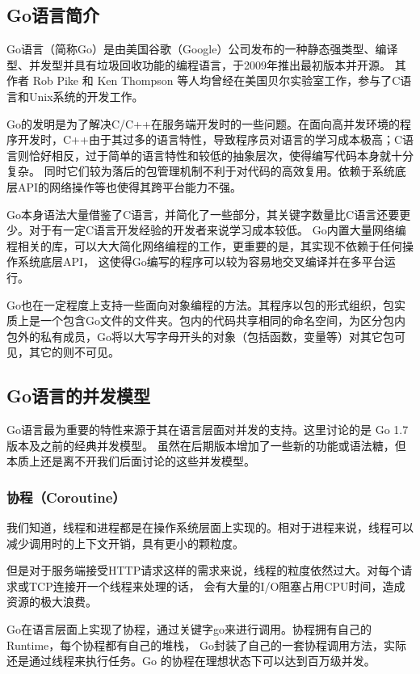\documentclass[twoside]{CUGThesis}
\begin{document}
	\subsection{Go语言简介}
	Go语言（简称Go）是由美国谷歌（Google）公司发布的一种静态强类型、编译型、并发型并具有垃圾回收功能的编程语言\cite{donovan2015go}，于2009年推出最初版本并开源。
	其作者 Rob Pike 和 Ken Thompson 等人均曾经在美国贝尔实验室工作，参与了C语言和Unix系统的开发工作。\par 
	Go的发明是为了解决C/C++在服务端开发时的一些问题。在面向高并发环境的程序开发时，C++由于其过多的语言特性，导致程序员对语言的学习成本极高；C语言则恰好相反，过于简单的语言特性和较低的抽象层次，使得编写代码本身就十分复杂。
	同时它们较为落后的包管理机制不利于对代码的高效复用。依赖于系统底层API的网络操作等也使得其跨平台能力不强。\par
	Go本身语法大量借鉴了C语言，并简化了一些部分，其关键字数量比C语言还要更少。对于有一定C语言开发经验的开发者来说学习成本较低。
	Go内置大量网络编程相关的库，可以大大简化网络编程的工作，更重要的是，其实现不依赖于任何操作系统底层API，
	这使得Go编写的程序可以较为容易地交叉编译并在多平台运行。\par
	Go也在一定程度上支持一些面向对象编程的方法。其程序以包的形式组织，包实质上是一个包含Go文件的文件夹。包内的代码共享相同的命名空间，为区分包内
	包外的私有成员，Go将以大写字母开头的对象（包括函数，变量等）对其它包可见，其它的则不可见。\par 
	\subsection{Go语言的并发模型}
	Go语言最为重要的特性来源于其在语言层面对并发的支持。这里讨论的是 Go 1.7 版本及之前的经典并发模型。
	虽然在后期版本增加了一些新的功能或语法糖，但本质上还是离不开我们后面讨论的这些并发模型。
	\subsubsection{协程（Coroutine）}
	我们知道，线程和进程都是在操作系统层面上实现的。相对于进程来说，线程可以减少调用时的上下文开销，具有更小的颗粒度。\par 
	但是对于服务端接受HTTP请求这样的需求来说，线程的粒度依然过大。对每个请求或TCP连接开一个线程来处理的话，
	会有大量的I/O阻塞占用CPU时间，造成资源的极大浪费。\par 
	Go在语言层面上实现了协程，通过关键字go来进行调用。协程拥有自己的Runtime，每个协程都有自己的堆栈，
	Go封装了自己的一套协程调用方法，实际还是通过线程来执行任务。Go 的协程在理想状态下可以达到百万级并发\cite{deshpande2012analysis}。
\end{document}
